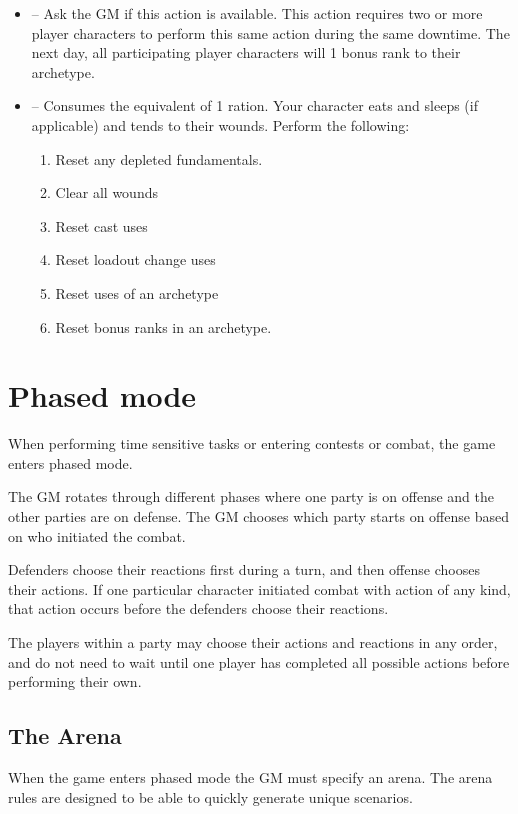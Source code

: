 \begin{GRPquicknotewide}
\begin{itemize}
	\item {}-- Ask the GM if this action is available. This action requires two or more player characters to perform this same action during the same downtime. The next day, all participating player characters will 1 bonus rank to their archetype.
	\item {}-- Consumes the equivalent of 1 ration. Your character eats and sleeps (if applicable) and tends to their wounds. Perform the following:
		\begin{enumerate}
			\item Reset any depleted fundamentals.
			\item Clear all wounds
			\item Reset cast uses
			\item Reset loadout change uses
			\item Reset uses of an archetype
			\item Reset bonus ranks in an archetype.
    	\end{enumerate}
\end{itemize}

\end{GRPquicknotewide}

\section{Phased mode}

When performing time sensitive tasks or entering contests or combat, the game enters phased mode.

The GM rotates through different phases where one party is on offense and the other parties are on defense. The GM chooses which party starts on offense based on who initiated the combat.

Defenders choose their reactions first during a turn, and then offense chooses their actions. If one particular character initiated combat with action of any kind, that action occurs before the defenders choose their reactions.

The players within a party may choose their actions and reactions in any order, and do not need to wait until one player has completed all possible actions before performing their own.

\subsection{The Arena}
When the game enters phased mode the GM must specify an arena. The arena rules are designed to be able to quickly generate unique scenarios.

